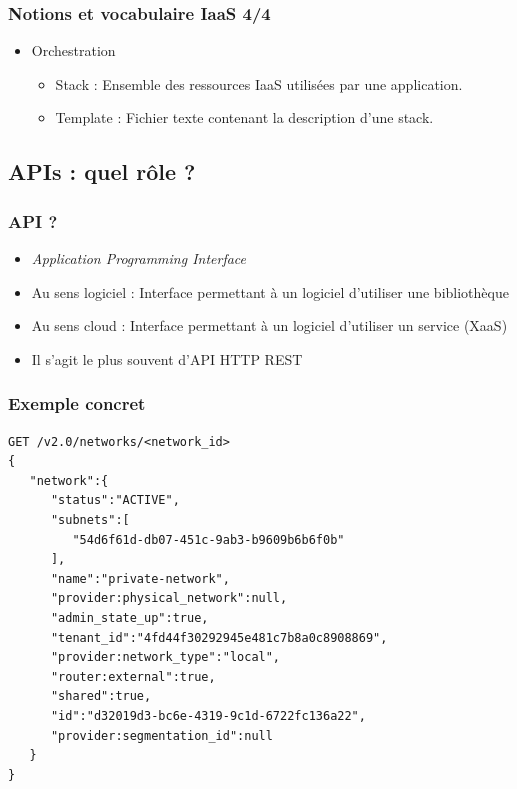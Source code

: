   \begin{frame}
    \frametitle{Notions et vocabulaire IaaS 4/4}
    \begin{itemize}
      \item Orchestration \pause
      \begin{itemize}
        \item Stack : Ensemble des ressources IaaS utilisées par une application. \pause
        \item Template : Fichier texte contenant la description d'une stack.
      \end{itemize}
    \end{itemize}
  \end{frame}

  \subsection[APIs]{APIs : quel rôle ?}

  \begin{frame}
    \frametitle{API ?}
    \begin{itemize}
      \item \textit{Application Programming Interface}
      \item Au sens logiciel : Interface permettant à un logiciel d'utiliser une bibliothèque
      \item Au sens cloud : Interface permettant à un logiciel d'utiliser un service (XaaS)
      \item Il s'agit le plus souvent d'API HTTP REST
    \end{itemize}
  \end{frame}

  \begin{frame}[containsverbatim]
    \frametitle{Exemple concret}
\begin{verbatim}
GET /v2.0/networks/<network_id>
{
   "network":{
      "status":"ACTIVE",
      "subnets":[
         "54d6f61d-db07-451c-9ab3-b9609b6b6f0b"
      ],
      "name":"private-network",
      "provider:physical_network":null,
      "admin_state_up":true,
      "tenant_id":"4fd44f30292945e481c7b8a0c8908869",
      "provider:network_type":"local",
      "router:external":true,
      "shared":true,
      "id":"d32019d3-bc6e-4319-9c1d-6722fc136a22",
      "provider:segmentation_id":null
   }
}
\end{verbatim}
  \end{frame}

